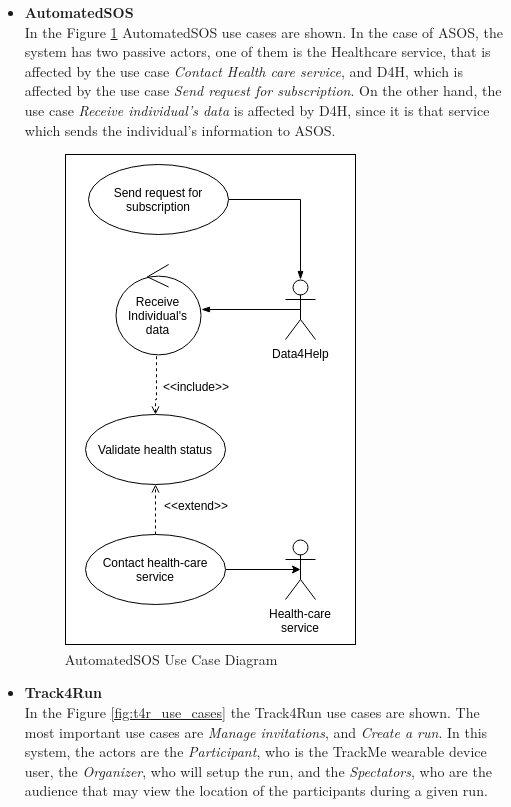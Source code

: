\documentclass[hidelinks, 12pt]{report}
\begin{document}
\begin{itemize}
		\item{\textbf{AutomatedSOS}}\\
		In the Figure \ref{fig:asos_use_cases} AutomatedSOS use cases are shown. In the case of ASOS, the system has two passive actors, one of them is the Healthcare service, that is affected by the use case \textit{Contact Health care service}, and D4H, which is affected by the use case \textit{Send request for subscription}. On the other hand, the use case \textit{Receive individual's data} is affected by D4H, since it is that service which sends the individual's information to ASOS.
		
		\begin{figure}[H]
			\centering
			\includegraphics[scale=0.7]{Diagrams/asos_use_cases.png}
			\caption[AutomatedSOS Use Case Diagram]{AutomatedSOS Use Case Diagram}
			\label{fig:asos_use_cases}
		\end{figure}
		
		\item{\textbf{Track4Run}}\\
		In the Figure \ref{fig:t4r_use_cases} the Track4Run use cases are shown. The most important use cases are \textit{Manage invitations}, and \textit{Create a run}. In this system, the actors are the \textit{Participant}, who is the TrackMe wearable device user, the \textit{Organizer}, who will setup the run, and the \textit{Spectators}, who are the audience that may view the location of the participants during a given run.
		

\end{itemize}
\end{document}
